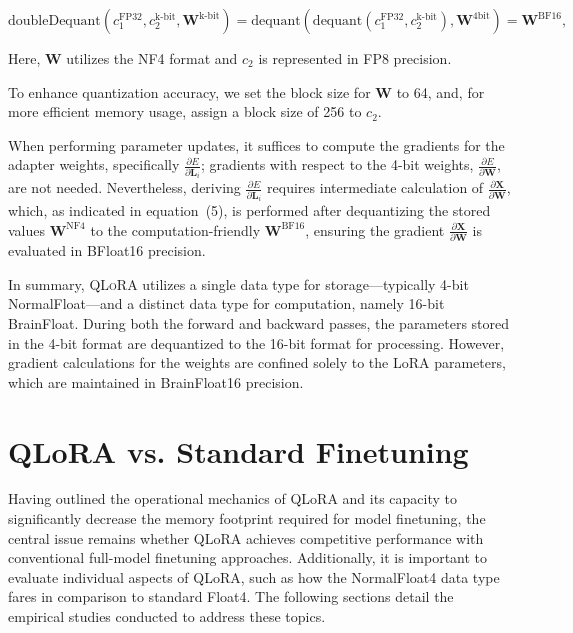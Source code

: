 \begin{equation}
    \text{doubleDequant}(c_1^{\text{FP32}}, c_2^{\text{k-bit}}, \mathbf{W}^{\text{k-bit}}) = \text{dequant}(\text{dequant}(c_1^{\text{FP32}}, c_2^{\text{k-bit}}), \mathbf{W}^{\text{4bit}}) = \mathbf{W}^{\text{BF16}},
\end{equation}

Here, $\mathbf{W}$ utilizes the NF4 format and $c_2$ is represented in FP8 precision.

To enhance quantization accuracy, we set the block size for $\mathbf{W}$ to 64, and, for more efficient memory usage, assign a block size of 256 to $c_2$.

When performing parameter updates, it suffices to compute the gradients for the adapter weights, specifically $\frac{\partial E}{\partial \mathbf{L}_i}$; gradients with respect to the 4-bit weights, $\frac{\partial E}{\partial \mathbf{W}}$, are not needed. Nevertheless, deriving $\frac{\partial E}{\partial \mathbf{L}_i}$ requires intermediate calculation of $\frac{\partial \mathbf{X}}{\partial \mathbf{W}}$, which, as indicated in equation~(5), is performed after dequantizing the stored values $\mathbf{W}^{\text{NF4}}$ to the computation-friendly $\mathbf{W}^{\text{BF16}}$, ensuring the gradient $\frac{\partial \mathbf{X}}{\partial \mathbf{W}}$ is evaluated in BFloat16 precision.

In summary, \textsc{QLoRA} utilizes a single data type for storage—typically 4-bit NormalFloat—and a distinct data type for computation, namely 16-bit BrainFloat. During both the forward and backward passes, the parameters stored in the 4-bit format are dequantized to the 16-bit format for processing. However, gradient calculations for the weights are confined solely to the LoRA parameters, which are maintained in BrainFloat16 precision.

\section{QLoRA vs. Standard Finetuning}
\label{sec:comp_to_std}

Having outlined the operational mechanics of QLoRA and its capacity to significantly decrease the memory footprint required for model finetuning, the central issue remains whether QLoRA achieves competitive performance with conventional full-model finetuning approaches. Additionally, it is important to evaluate individual aspects of QLoRA, such as how the NormalFloat4 data type fares in comparison to standard Float4. The following sections detail the empirical studies conducted to address these topics.

